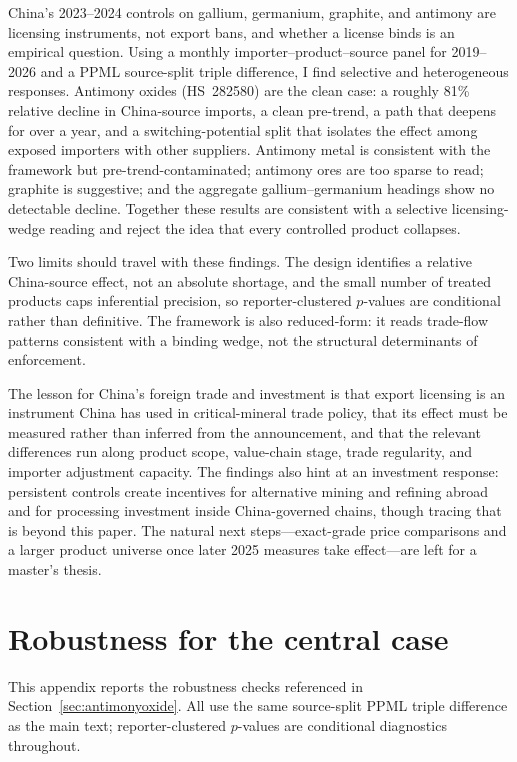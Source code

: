 \documentclass[12pt,a4paper]{article}
\begin{document}
China's 2023--2024 controls on gallium, germanium, graphite, and antimony are
licensing instruments, not export bans, and whether a license binds is an
empirical question. Using a monthly importer--product--source panel for
2019--2026 and a PPML source-split triple difference, I find selective and
heterogeneous responses. Antimony oxides (HS~282580) are the clean case: a
roughly 81\% relative decline in China-source imports, a clean pre-trend, a path
that deepens for over a year, and a switching-potential split that isolates the
effect among exposed importers with other suppliers. Antimony metal is
consistent with the framework but pre-trend-contaminated; antimony ores are too
sparse to read; graphite is suggestive; and the aggregate gallium--germanium
headings show no detectable decline. Together these results are consistent with
a selective licensing-wedge reading and reject the idea that every controlled
product collapses.

Two limits should travel with these findings. The design identifies a relative
China-source effect, not an absolute shortage, and the small number of treated
products caps inferential precision, so reporter-clustered $p$-values are
conditional rather than definitive. The framework is also reduced-form: it reads
trade-flow patterns consistent with a binding wedge, not the structural
determinants of enforcement.

The lesson for China's foreign trade and investment is that export licensing is
an instrument China has used in critical-mineral trade policy, that its effect must be measured rather than
inferred from the announcement, and that the relevant differences run along
product scope, value-chain stage, trade regularity, and importer adjustment
capacity. The findings also hint at an investment response: persistent controls
create incentives for alternative mining and refining abroad and for processing
investment inside China-governed chains, though tracing that is beyond this
paper. The natural next steps---exact-grade price comparisons and a larger
product universe once later 2025 measures take effect---are left for a master's
thesis.

\renewcommand{\refname}{References}
\begingroup
\raggedright
\sloppy
\small


\endgroup

\appendix
\section{Robustness for the central case}\label{sec:appendix_robustness}

This appendix reports the robustness checks referenced in
Section~\ref{sec:antimonyoxide}. All use the same source-split PPML triple
difference as the main text; reporter-clustered $p$-values are conditional
diagnostics throughout.








\end{document}

